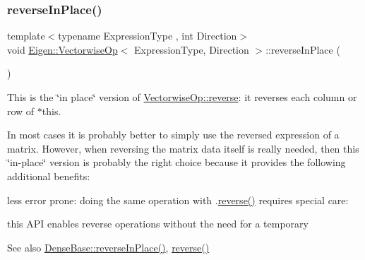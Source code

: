 \subsubsection{\texorpdfstring{reverseInPlace()}{reverseInPlace()}}
{\footnotesize\ttfamily template$<$typename Expression\+Type , int Direction$>$ \\
void \mbox{\hyperlink{class_eigen_1_1_vectorwise_op}{Eigen\+::\+Vectorwise\+Op}}$<$ Expression\+Type, Direction $>$\+::reverse\+In\+Place (\begin{DoxyParamCaption}{ }\end{DoxyParamCaption})\hspace{0.3cm}{\ttfamily [inline]}}

This is the \char`\"{}in place\char`\"{} version of \mbox{\hyperlink{class_eigen_1_1_vectorwise_op_a058b821b65e2e27839853d9a25b0216c}{Vectorwise\+Op\+::reverse}}\+: it reverses each column or row of {\ttfamily $\ast$this}.

In most cases it is probably better to simply use the reversed expression of a matrix. However, when reversing the matrix data itself is really needed, then this \char`\"{}in-\/place\char`\"{} version is probably the right choice because it provides the following additional benefits\+:
\begin{DoxyItemize}
\item less error prone\+: doing the same operation with .\mbox{\hyperlink{class_eigen_1_1_vectorwise_op_a094915725d604015221205e8c4ccb993}{reverse()}} requires special care\+: 
\begin{DoxyCode}{0}
\end{DoxyCode}

\item this A\+PI enables reverse operations without the need for a temporary
\end{DoxyItemize}

\begin{DoxySeeAlso}{See also}
\mbox{\hyperlink{class_eigen_1_1_dense_base_adb8045155ea45f7961fc2a5170e1d921}{Dense\+Base\+::reverse\+In\+Place()}}, \mbox{\hyperlink{class_eigen_1_1_vectorwise_op_a094915725d604015221205e8c4ccb993}{reverse()}} 
\end{DoxySeeAlso}
\mbox{\label{class_eigen_1_1_vectorwise_op_a6f23ba41822436d3176d718596be8fd0}} 
